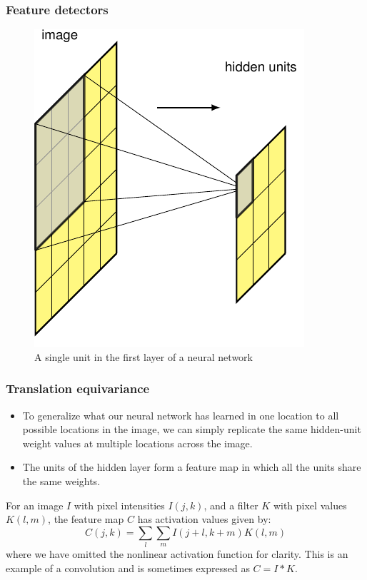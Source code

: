 \documentclass{beamer}
\begin{document}
\begin{frame}
    \frametitle{Feature detectors}
    \begin{figure}
        \caption{A single unit in the first layer of a neural network}
        \includegraphics[height=0.7\textheight]{Figure_1_a.pdf}
    \end{figure}
\end{frame}

\begin{frame}
    \frametitle{Translation equivariance}
    \begin{itemize}
        \item To generalize what our neural network has learned in one location to all possible locations in the image, we can simply replicate the same hidden-unit weight values at multiple locations across the image.
        \item The units of the hidden layer form a feature map in which all the units share the same weights.
    \end{itemize}
    For an image $I$ with pixel intensities $I(j,k)$, and a filter $K$ with pixel values $K(l,m)$, the feature map $C$ has activation values given by:
    \begin{equation*}
        C(j,k)=\sum_{l}\sum_{m}I(j+l,k+m)K(l,m)
    \end{equation*}
    where we have omitted the nonlinear activation function for clarity. This is an example of a convolution and is sometimes expressed as $C=I*K$.
\end{frame}
\end{document}
